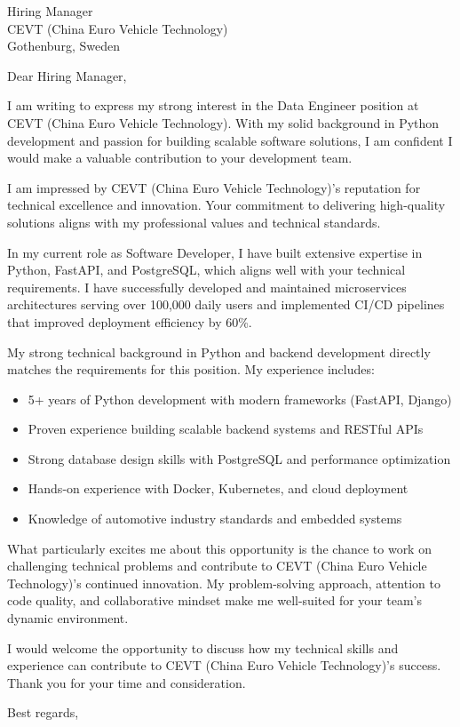 \documentclass[11pt,a4paper]{letter}
\begin{document}
\begin{letter}{Hiring Manager \\ CEVT (China Euro Vehicle Technology) \\ Gothenburg, Sweden}

\opening{Dear Hiring Manager,}

I am writing to express my strong interest in the Data Engineer position at CEVT (China Euro Vehicle Technology). With my solid background in Python development and passion for building scalable software solutions, I am confident I would make a valuable contribution to your development team.

I am impressed by CEVT (China Euro Vehicle Technology)'s reputation for technical excellence and innovation. Your commitment to delivering high-quality solutions aligns with my professional values and technical standards.

In my current role as Software Developer, I have built extensive expertise in Python, FastAPI, and PostgreSQL, which aligns well with your technical requirements. I have successfully developed and maintained microservices architectures serving over 100,000 daily users and implemented CI/CD pipelines that improved deployment efficiency by 60\%.

My strong technical background in Python and backend development directly matches the requirements for this position. My experience includes:

\begin{itemize}
\item 5+ years of Python development with modern frameworks (FastAPI, Django)
\item Proven experience building scalable backend systems and RESTful APIs
\item Strong database design skills with PostgreSQL and performance optimization
\item Hands-on experience with Docker, Kubernetes, and cloud deployment
\item Knowledge of automotive industry standards and embedded systems
\end{itemize}

What particularly excites me about this opportunity is the chance to work on challenging technical problems and contribute to CEVT (China Euro Vehicle Technology)'s continued innovation. My problem-solving approach, attention to code quality, and collaborative mindset make me well-suited for your team's dynamic environment.

I would welcome the opportunity to discuss how my technical skills and experience can contribute to CEVT (China Euro Vehicle Technology)'s success. Thank you for your time and consideration.

\closing{Best regards,}

\end{letter}
\end{document}
